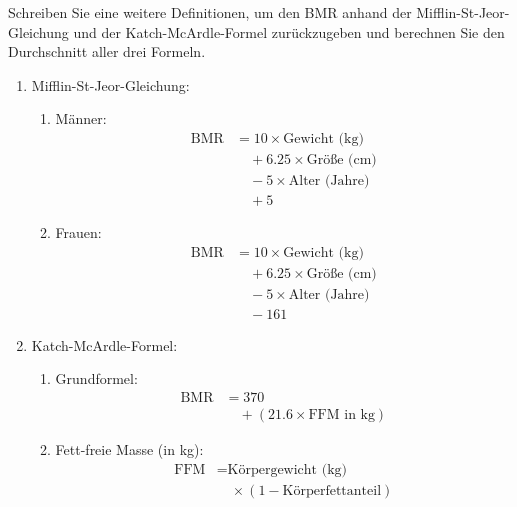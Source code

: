 \begin{mysubmission}\label{ex:bmr}
Schreiben Sie eine weitere Definitionen, um den \gls{BMR} anhand der Mifflin-St-Jeor-Gleichung und der Katch-McArdle-Formel zurückzugeben und berechnen Sie den Durchschnitt aller drei Formeln.
\begin{enumerate}
\item Mifflin-St-Jeor-Gleichung:
\begin{enumerate}
\item Männer: 
\begin{align*}
\text{BMR} &= 10 \times \text{Gewicht (kg)} \\
&\quad + 6.25 \times \text{Größe (cm)} \\
&\quad - 5 \times \text{Alter (Jahre)} \\
&\quad + 5
\end{align*}
\item Frauen: 
\begin{align*}
\text{BMR} &= 10 \times \text{Gewicht (kg)} \\
&\quad + 6.25 \times \text{Größe (cm)} \\
&\quad - 5 \times \text{Alter (Jahre)} \\
&\quad - 161
\end{align*}
\end{enumerate}
\item Katch-McArdle-Formel:
\begin{enumerate}
\item Grundformel:
\begin{align*}
\text{BMR} &= 370 \\
&\quad + (21.6 \times \text{FFM in kg})
\end{align*}

\item Fett-freie Masse (in kg): 
\begin{align*}
\text{FFM} &= \text{Körpergewicht (kg)} \\
&\quad \times (1 - \text{Körperfettanteil})
\end{align*}

\end{enumerate}

\end{enumerate}

\begin{myanswer}

\end{myanswer}
\end{mysubmission}

